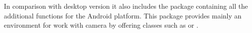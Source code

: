 In comparison with desktop version it also includes the  package containing all the additional functions for the Android platform.
This package provides mainly an environment for work with camera by offering classes such as   or  .

